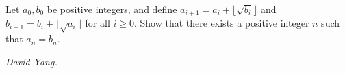 Let $a_0,b_0$ be positive integers, and define $a_{i+1}=a_i+\lfloor\sqrt{b_i}\rfloor$ and $b_{i+1}=b_i+\lfloor\sqrt{a_i}\rfloor$ for all $i\ge0$. Show that there exists a positive integer $n$ such that $a_n=b_n$.

\textit{David Yang.}